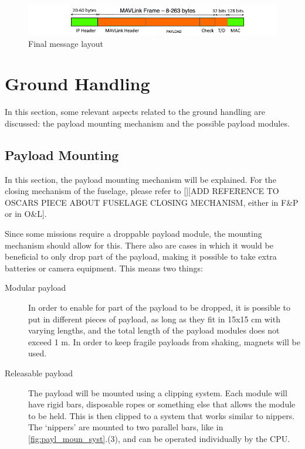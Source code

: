 \begin{figure}[htb]
    \centering
    \includegraphics[width=\textwidth]{./CommandDataHandling/Figures/encryption}
    \caption{Final message layout}
    \label{fig:encr_mess}
\end{figure}






\section{Ground Handling}%

In this section, some relevant aspects related to the ground handling are discussed: the payload mounting mechanism and the possible payload modules.




\subsection{Payload Mounting}

In this section, the payload mounting mechanism will be explained. For the closing mechanism of the fuselage, please refer to \autoref{}[ADD REFERENCE TO OSCARS PIECE ABOUT FUSELAGE CLOSING MECHANISM, either in F\&P or in O\&L]. 


Since some missions require a droppable payload module, the mounting mechanism should allow for this. There also are cases in which it would be beneficial to only drop part of the payload, making it possible to take extra batteries or camera equipment. This means two things:

\begin{description}
\item[Modular payload] In order to enable for part of the payload to be dropped, it is possible to put in different pieces of payload, as long as they fit in 15x15 cm with varying lengths, and the total length of the payload modules does not exceed 1 m. In order to keep fragile payloads from shaking, magnets will be used.  
\item[Releasable payload] The payload will be mounted using a clipping system. Each module will have rigid bars, disposable ropes or something else that allows the module to be held. This is then clipped to a system that works similar to nippers. The `nippers' are mounted to two parallel bars, like in \autoref{fig:payl_moun_syst}.(3), and can be operated individually by the CPU. 
\end{description}

